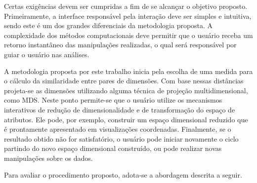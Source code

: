 Certas exigências devem ser cumpridas a fim de se alcançar o objetivo proposto. Primeiramente, a interface responsável pela interação deve ser simples e intuitiva, sendo este é um dos grandes diferenciais da metodologia proposta. A complexidade dos métodos computacionais deve permitir que o usuário receba um retorno instantâneo das manipulações realizadas, o qual será responsável por guiar o usuário nas análises. 

A metodologia proposta por este trabalho inicia pela escolha de uma medida para o cálculo da similaridade entre pares de dimensões. Com base nessas distâncias projeta-se as dimensões utilizando alguma técnica de projeção multidimensional, como MDS. Neste ponto permite-se que o usuário utilize os mecanismos interativos de redução de dimensionalidade e de transformação do espaço de atributos. Ele pode, por exemplo, construir um espaço dimensional reduzido que é prontamente apresentado em visualizações coordenadas. Finalmente, se o resultado obtido não for satisfatório, o usuário pode iniciar novamente o ciclo partindo do novo espaço dimensional construído, ou pode realizar novas manipulações sobre os dados.

Para avaliar o procedimento proposto, adota-se a abordagem descrita a seguir.






